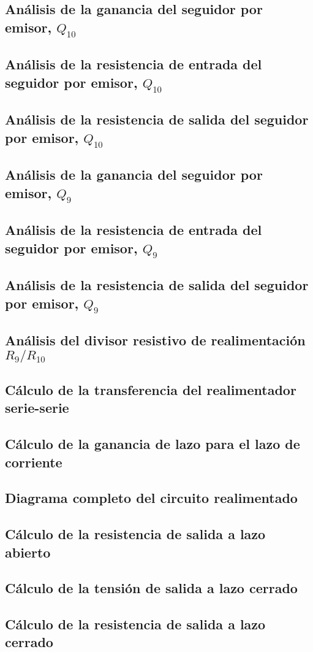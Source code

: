

\subsection{Análisis de la ganancia del seguidor por emisor, $Q_{10}$}

\subsection{Análisis de la resistencia de entrada del seguidor por emisor, $Q_{10}$}

\subsection{Análisis de la resistencia de salida del seguidor por emisor, $Q_{10}$}

\subsection{Análisis de la ganancia del seguidor por emisor, $Q_{9}$}

\subsection{Análisis de la resistencia de entrada del seguidor por emisor, $Q_{9}$}

\subsection{Análisis de la resistencia de salida del seguidor por emisor, $Q_{9}$}

\subsection{Análisis del divisor resistivo de realimentación $R_{9}/R_{10}$}

\subsection{Cálculo de la transferencia del realimentador serie-serie}

\subsection{Cálculo de la ganancia de lazo para el lazo de corriente}

\subsection{Diagrama completo del circuito realimentado}

\subsection{Cálculo de la resistencia de salida a lazo abierto}

\subsection{Cálculo de la tensión de salida a lazo cerrado}

\subsection{Cálculo de la resistencia de salida a lazo cerrado}

